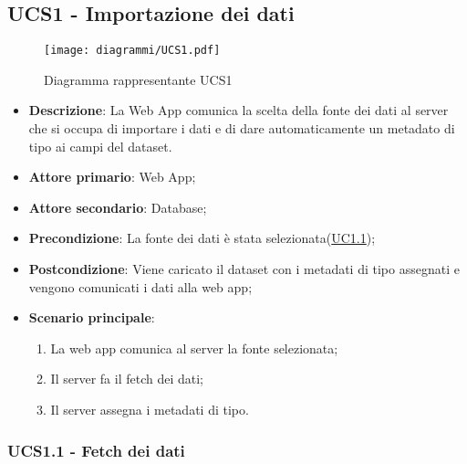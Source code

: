 \subsection{UCS1 - Importazione dei dati}
\label{sub:ucs1}


\begin{figure}[h]
    \centering
    \texttt{[image: diagrammi/UCS1.pdf]}
    \caption{Diagramma rappresentante UCS1}
    \label{fig:UCS1}
\end{figure}

\begin{itemize}
    \item \textbf{Descrizione}: La Web App comunica la scelta della fonte dei dati al server che si occupa di importare i dati e di dare automaticamente un metadato di tipo ai campi del dataset.
	
    \item \textbf{Attore primario}: Web App;
	\item \textbf{Attore secondario}: Database;
        
    \item \textbf{Precondizione}:   La fonte dei dati è stata selezionata(\hyperref[ssub:uc1.1]{UC1.1});

    \item \textbf{Postcondizione}:  Viene caricato il dataset con i metadati di tipo assegnati e vengono comunicati i dati alla web app;

	\item \textbf{Scenario principale}:
		\begin{enumerate}
			\item La web app comunica al server la fonte selezionata;
            \item Il server fa il fetch dei dati;
			\item Il server assegna i metadati di tipo.
        \end{enumerate}
   
\end{itemize}

\subsubsection{UCS1.1 - Fetch dei dati}
\label{ssub:ucs1.1}

